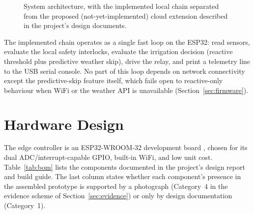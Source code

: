 \documentclass[conference]{IEEEtran}
\begin{document}
\begin{figure}[t]
{%
}
\caption{System architecture, with the implemented local chain
separated from the proposed (not-yet-implemented) cloud extension
described in the project's design documents.}
\label{fig:arch}
\end{figure}

The implemented chain operates as a single fast loop on the ESP32: read
sensors, evaluate the local safety interlocks, evaluate the irrigation
decision (reactive threshold plus predictive weather skip), drive the
relay, and print a telemetry line to the USB serial console. No part of
this loop depends on network connectivity except the predictive-skip
feature itself, which fails open to reactive-only behaviour when WiFi
or the weather API is unavailable (Section~\ref{sec:firmware}).

\section{Hardware Design}
\label{sec:hardware}

The edge controller is an ESP32-WROOM-32 development board
\cite{espressif2023esp32}, chosen for its dual ADC/interrupt-capable
GPIO, built-in WiFi, and low unit cost. Table~\ref{tab:bom} lists the
components documented in the project's design report and build guide.
The last column states whether each component's presence in the
assembled prototype is supported by a photograph (Category~4 in the
evidence scheme of Section~\ref{sec:evidence}) or only by design
documentation (Category~1).
\end{document}
